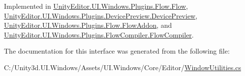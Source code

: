 Implemented in \hyperlink{class_unity_editor_1_1_u_i_1_1_windows_1_1_plugins_1_1_flow_1_1_flow_a16d4bfb0b617138cc4a16ea51b798e1f}{Unity\+Editor.\+U\+I.\+Windows.\+Plugins.\+Flow.\+Flow}, \hyperlink{class_unity_editor_1_1_u_i_1_1_windows_1_1_plugins_1_1_device_preview_1_1_device_preview_a9277594a2cc92fc67cab8cd690affa62}{Unity\+Editor.\+U\+I.\+Windows.\+Plugins.\+Device\+Preview.\+Device\+Preview}, \hyperlink{class_unity_editor_1_1_u_i_1_1_windows_1_1_plugins_1_1_flow_1_1_flow_addon_aebacd992030dad733086ba347b4f588d}{Unity\+Editor.\+U\+I.\+Windows.\+Plugins.\+Flow.\+Flow\+Addon}, and \hyperlink{class_unity_editor_1_1_u_i_1_1_windows_1_1_plugins_1_1_flow_compiler_1_1_flow_compiler_a7bbe37ce600a45af8cdc34a608537d23}{Unity\+Editor.\+U\+I.\+Windows.\+Plugins.\+Flow\+Compiler.\+Flow\+Compiler}.



The documentation for this interface was generated from the following file\+:\begin{DoxyCompactItemize}
\item 
C\+:/\+Unity3d.\+U\+I.\+Windows/\+Assets/\+U\+I.\+Windows/\+Core/\+Editor/\hyperlink{_window_utilities_8cs}{Window\+Utilities.\+cs}\end{DoxyCompactItemize}
